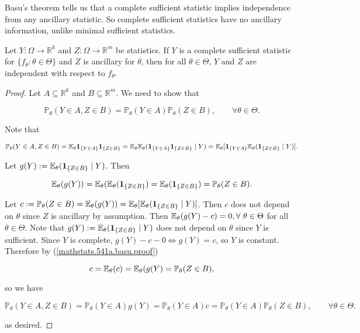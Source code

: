 Basu's theorem tells us that a complete sufficient statistic implies independence from any ancillary statistic. So complete sufficient statistics have no ancillary information, unlike minimal sufficient statistics.

\begin{theorem} Let \(Y: \Omega \to \mathbb{R}^k\) and \(Z: \Omega \to \mathbb{R}^m\) be statistics. If \(Y\) is a complete sufficient statistic for \(\{f_\theta: \theta \in \Theta\}\) and \(Z\) is ancillary for \(\theta\), then for all \(\theta \in \Theta\), \(Y\) and \(Z\) are independent with respect to \(f_\theta\).

\end{theorem}

\begin{proof} Let \(A \subseteq \mathbb{R}^k\) and \(B \subseteq \mathbb{R}^m\). We need to show that 

\[
\mathbb{P}_\theta (Y \in A, Z \in B) = \mathbb{P}_\theta (Y \in A) \mathbb{P}_\theta (Z \in B), \qquad \forall \theta \in \Theta.
\]

Note that

\[
\mathbb{P}_\theta (Y \in A, Z \in B) = \E_\theta \boldsymbol{1}_{\{Y \in A \}} \boldsymbol{1}_{\{Z \in B\}} =  \E_\theta  \E_\theta(\boldsymbol{1}_{\{Y \in A \}} \boldsymbol{1}_{\{Z \in B\}}  \mid Y) = \E_\theta [  \boldsymbol{1}_{\{Y \in A \}}\E_\theta( \boldsymbol{1}_{\{Z \in B\}}  \mid Y) ].
\]

Let \(g(Y) := \E_\theta( \boldsymbol{1}_{\{Z \in B\}} \mid Y ) \). Then

 \begin{equation}\label{mathstats.541a.basu.proof}
\E_\theta (g(Y)) = \E_\theta (\E_\theta( \boldsymbol{1}_{\{Z \in B\}}) = \E_\theta( \boldsymbol{1}_{\{Z \in B\}}) = \mathbb{P}_\theta ( Z \in B).
\end{equation}

Let \(c:= \mathbb{P}_\theta ( Z \in B) = \E_\theta (g(Y))  = \E_\theta [\E_\theta( \boldsymbol{1}_{\{Z \in B\}} \mid Y )] \). Then \(c\) does not depend on \(\theta\) since \(Z\) is ancillary by assumption. Then \(\E_\theta(g(Y) - c) = 0, \forall \ \theta \in \Theta\) for all \(\theta \in \Theta\). Note that  \(g(Y) := \E_\theta( \boldsymbol{1}_{\{Z \in B\}} \mid Y) \) does not depend on \(\theta\) since \(Y\) is sufficient. Since \(Y\) is complete, \(g(Y) - c - 0 \iff g(Y) = c\), so \(Y\) is constant. Therefore by (\ref{mathstats.541a.basu.proof})

\[
c = \E_\theta(c) = \E_\theta(g(Y) = \mathbb{P}_\theta ( Z \in B),
\]

so we have

\[
\mathbb{P}_\theta (Y \in A, Z \in B) = \mathbb{P}_\theta (Y \in A)g(Y) = \mathbb{P}_\theta (Y \in A)c  = \mathbb{P}_\theta (Y \in A)\mathbb{P}_\theta ( Z \in B)  , \qquad \forall \theta \in \Theta.
\]

as desired.

\end{proof}

